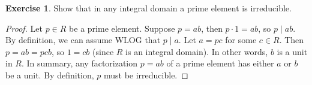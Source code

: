 \documentclass{article}
\theoremstyle{definition}
\newtheorem{exercise}{Exercise}
\begin{document}
\newpage

\begin{exercise}
Show that in any integral domain a prime element is irreducible.
\end{exercise}
\begin{proof}
Let $p \in R$ be a prime element. Suppose $p = ab$, then $p \cdot 1 = ab$, so $p \mid ab$. By definition, we can assume WLOG that $p \mid a$. Let $a = pc$ for some $c \in R$. Then $p = ab = pcb$, so $1 = cb$ (since $R$ is an integral domain). In other words, $b$ is a unit in $R$. In summary, any factorization $p = ab$ of a prime element has either $a$ or $b$ be a unit. By definition, $p$ must be irreducible.
\end{proof}
\end{document}

